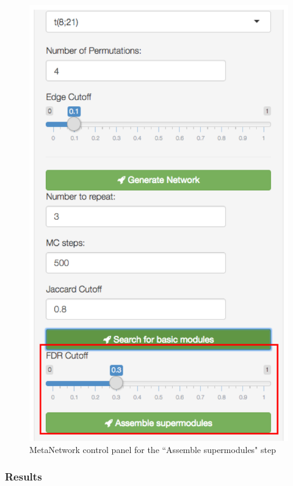\begin{steps}
\begin{figure}[H]
\begin{center}
\includegraphics[scale=0.5]{./figure/MetaNetwork/MetaNetworkstep3}
\caption{MetaNetwork control panel for the ``Assemble supermodules" step}
\label{fig:MetaNetworkstep3}
\end{center}
\end{figure}



\end{steps}

\subsubsection{Results}

